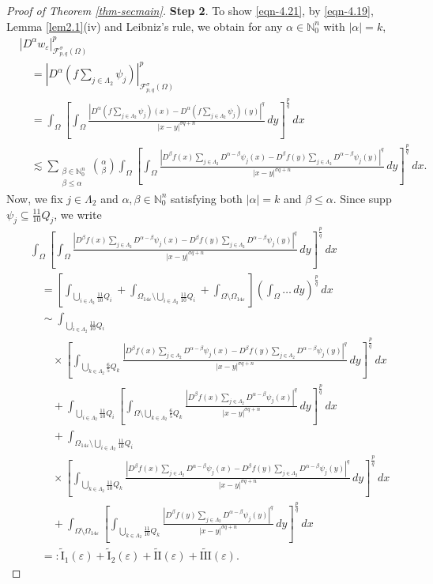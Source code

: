 \documentclass[11pt,twoside]{article}
\def\nn{{\mathbb N}}
\def\nno{\nn_0}
\def\cf{{\mathcal F}}
\def\Qi{\frac{11}{10}Q_i}
\def\Qkk{\frac{6}{5}Q_k}
\def\Qk{\frac{11}{10}Q_k}
\def\Qj{\frac{11}{10}Q_j}
\def\az{\alpha}
\def\bz{\beta}
\def\blz{\Lambda}
\def\boz{{\Omega}}
\def\sz{\sigma}
\def\vez{\varepsilon}
\def\fpjzuhe{D^{\bz}f(x) \sum_{j \in \Lambda_2}D^{\az - \bz} \psi_j(x)}
\def\fpjzuhey{D^{\bz}f(y) \sum_{j \in \Lambda_2}D^{\az - \bz} \psi_j(y)}
\def\we{w_{\varepsilon}}
\def\huae{\varepsilon}
\def\bozfour{\Omega_{14\huae}}
\theoremstyle{mylem}
\theoremstyle{definition}
\numberwithin{equation}{section}
\begin{document}
\begin{proof}[Proof of Theorem \ref{thm-secmain}]
{\bf Step 2}. To show \eqref{eqn-4.21}, by \eqref{eqn-4.19}, Lemma \ref{lem2.1}(iv) and Leibniz's rule, we obtain for any $\az\in\nno^n$ with $|\az|=k$,
\begin{align}\label{eqn-8.5}
&\left| D^{\az} \we \right|_{\cf_{p,q}^{\sz}(\boz)}^p \nonumber\\
&\quad= \left| D^{\alpha} \left(f \sum_{j \in \Lambda_2} \psi_j\right) \right|_{\cf_{p,q}^{\sz}(\boz)}^p \nonumber\\
&\quad= \int_{\boz} \left[\int_{\boz} \frac{|D^{\alpha} (f \sum_{j \in \Lambda_2} \psi_j)(x) - D^{\alpha} (f \sum_{j \in \Lambda_2} \psi_j)(y)|^q}{|x - y|^{\sz q + n}}\,dy \right]^{\frac{p}{q}}\,dx \nonumber\\
&\quad\lesssim \sum_{\substack{\bz\in\nno^n \\ \bz \leq \az}} \binom{\az}{\bz} \int_{\boz} \left[ \int_{\boz} \frac{| \fpjzuhe -  \fpjzuhey|^q}{|x - y|^{\sz q + n}}\,dy \right]^{\frac{p}{q}}\,dx.
\end{align}
Now, we fix $j\in\Lambda_2$ and $\az,\bz\in\nno^n$ satisfying both $|\az|=k$ and $\bz\leq\az$. Since supp \(\psi_j \subseteq \Qj\), we write
\begin{align}\label{eqn-4.23}
&\int_{\boz} \left[\int_{\boz} \frac{| \fpjzuhe -  \fpjzuhey|^q}{|x - y|^{\sz q + n}}\,dy \right]^{\frac{p}{q}}\,dx \nonumber \\
&\quad= \left[ \int_{\bigcup_{i \in \blz_2} \Qi}
+ \int_{\bozfour \setminus \bigcup_{i \in \blz_2} \Qi}
+ \int_{\boz \setminus \bozfour} \right]
\left(\int_{\boz}\dots\,dy\right)^{\frac{p}{q}}\,dx \nonumber \\
&\quad\sim \int_{\bigcup_{i \in \blz_2} \Qi}\nonumber \\
&\quad\quad\times\left[ \int_{\bigcup_{k \in \blz_2} \Qkk}
\frac{| \fpjzuhe -  \fpjzuhey|^q}{|x - y|^{\sz q + n}}\,dy \right]^{\frac{p}{q}}\,dx \nonumber \\
&\qquad+ \int_{\bigcup_{i \in \blz_2} \Qi}
\left[ \int_{\boz \setminus \bigcup_{k \in \blz_2} \Qkk}
\frac{| \fpjzuhe |^q}{|x - y|^{\sz q + n}} \,dy \right]^{\frac{p}{q}}\,dx \nonumber \\
&\qquad+ \int_{\bozfour \setminus \bigcup_{i \in \blz_2} \Qi} \nonumber \\
&\qquad\times \left[ \int_{\bigcup_{k \in \blz_2} \Qk}
\frac{| \fpjzuhe -  \fpjzuhey|^q}{|x - y|^{\sz q + n}}\,dy \right]^{\frac{p}{q}}\,dx \nonumber \\
&\qquad+ \int_{\boz \setminus \bozfour}
\left[ \int_{\bigcup_{k \in \blz_2} \Qk}
\frac{| \fpjzuhey |^q}{|x - y|^{\sz q + n}}\,dy \right]^{\frac{p}{q}}\,dx \nonumber \\
&\quad=:\tilde{\mathrm{I}}_1(\vez)+\tilde{\mathrm{I}}_2(\vez)
+\tilde{\mathrm{II}}(\vez)+\tilde{\mathrm{III}}(\vez).
\end{align}


\end{proof}
\end{document}
